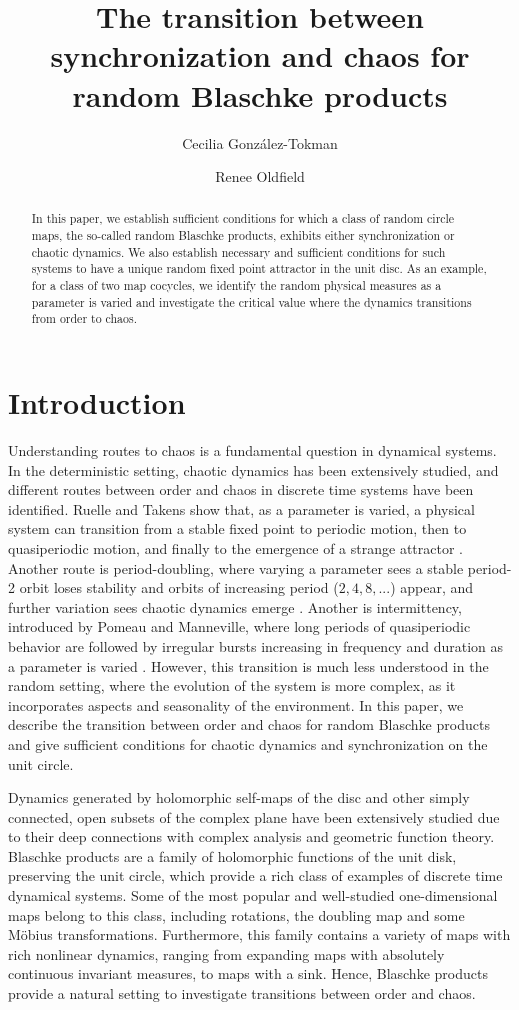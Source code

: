 \documentclass[12pt,reqno]{amsart}
\title[]{The transition between synchronization and chaos for random Blaschke products}
\author{Cecilia González-Tokman}
\author{Renee Oldfield}
\numberwithin{theorem}{section}
\begin{document}
\begin{abstract}
In this paper, we establish sufficient conditions for which a class of random circle maps, the so-called random Blaschke products, exhibits either synchronization or chaotic dynamics. We also establish necessary and sufficient conditions for such systems to have a unique random fixed point attractor in the unit disc. As an example, for a class of two map cocycles,
we identify the random physical measures as a parameter is varied and investigate the critical value where the dynamics transitions from order to chaos.
\end{abstract}

\maketitle

\section{Introduction}


Understanding routes to chaos is a fundamental question in dynamical systems. In the deterministic setting, chaotic dynamics has been extensively studied, and different routes between order and chaos in discrete time systems have been identified. Ruelle and Takens show that, as a parameter is varied, a physical system can transition from a stable fixed point to periodic motion, then to quasiperiodic motion, and finally to the emergence of a strange attractor \cite{ruelle_takens}. Another route is period-doubling, where varying a parameter sees a stable period-2 orbit loses stability and orbits of increasing period ($2,4,8,...$) appear, and further variation sees chaotic dynamics emerge \cite{feigenbaum}. Another is intermittency, introduced by Pomeau and Manneville, where long periods of quasiperiodic behavior are followed by irregular bursts increasing in frequency and duration as a parameter is varied \cite{intermittency}. However, this transition is much less understood in the random setting, where the evolution of the system is more complex, as it incorporates aspects and seasonality of the environment. In this paper, we describe the transition between order and chaos for random Blaschke products and give sufficient conditions for chaotic dynamics and synchronization on the unit circle.

Dynamics generated by holomorphic self-maps of the disc and other simply connected, open subsets of the complex plane have been extensively studied due to their deep connections with complex analysis and geometric function theory. Blaschke products are a family of holomorphic functions of the unit disk, preserving the unit circle, which provide a rich class of examples of discrete time dynamical systems. Some of the most popular and well-studied one-dimensional maps belong to this class, including rotations, the doubling map and some M\"obius transformations. Furthermore, this family contains a variety of maps with rich nonlinear dynamics, ranging from expanding maps with absolutely continuous invariant measures, to maps with a sink. Hence, Blaschke products provide a natural setting to investigate transitions between order and chaos.
\end{document}
